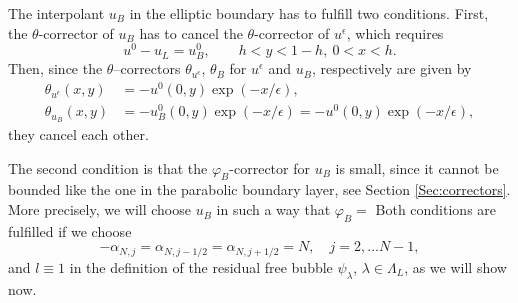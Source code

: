 \documentclass{article}
\newcommand{\est}{\text{\,e.s.t.}\xspace}
\newcommand{\ueps}{u^\epsilon}
\begin{document}
    








The interpolant $u_B$ in the elliptic boundary has to fulfill
two conditions. First, the $\theta$-corrector of $u_B$ has to cancel the $\theta$-corrector
of $\ueps$, which requires
$$
u^0 - u_L = u_B^0,
\qquad h < y < 1-h, \ 0 < x < h.
$$
Then, since the $\theta$--correctors $\theta_{\ueps}$, $\theta_{B}$ for $\ueps$ and $u_B$, 
respectively are given by
\begin{equation}\label{eq:canceledTheta}
\begin{aligned}
  \theta_{\ueps}(x,y) & = -u^0(0,y) \exp(-x/\epsilon), \\
  \theta_{u_B}(x,y) & = -u_B^0(0,y) \exp(-x/\epsilon) = -u^0(0,y) \exp(-x/\epsilon),
\end{aligned}
\end{equation}
they cancel each other.

The second condition is that the $\varphi_B$-corrector for $u_B$ is small, since it cannot be bounded
like the one in the parabolic boundary layer, see Section \ref{Sec:correctors}. 
More precisely, we will choose $u_B$ in such a way
that $\varphi_{B} =$\est 
Both conditions are fulfilled if we choose
\begin{equation}\label{Eq:tildealpha}
- \alpha_{N,j} = \alpha_{N,j-1/2}=\alpha_{N,j+1/2}= N,\quad j=2,\dots N-1,
\end{equation}
and
$l\equiv 1$ in the definition of the residual free bubble $\psi_\lambda$, $\lambda \in \Lambda_L$,
as we will show now. 
\end{document}
